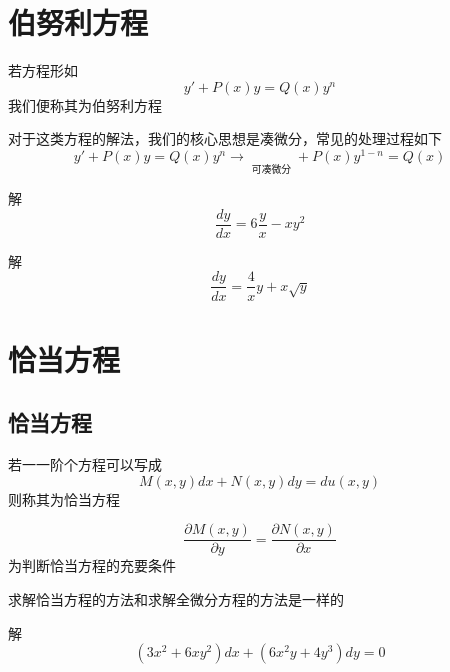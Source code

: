 \documentclass[lang=cn,14pt]{elegantbook}
\begin{document}
	\section{伯努利方程}
	\begin{definition}[伯努利方程]
		若方程形如
		\begin{equation*}
			y'+P\left( x \right) y=Q\left( x \right) y^n 
		\end{equation*}
		我们便称其为伯努利方程
	\end{definition}
	\begin{remark}
		对于这类方程的解法，我们的核心思想是凑微分，常见的处理过程如下
		\begin{equation*}
			y'+P\left( x \right) y=Q\left( x \right) y^n\rightarrow \mathop {\underbrace{y^{-n}y'}} \limits_{\text{可凑微分}}+P\left( x \right) y^{1-n}=Q\left( x \right) 
		\end{equation*}
	\end{remark}
	\begin{example}
		解\begin{equation*}
			\frac{dy}{dx}=6\frac{y}{x}-xy^2
		\end{equation*}
	\end{example}
	\vspace{2cm}
	\begin{example}
		解\begin{equation*}
			\frac{dy}{dx}=\frac{4}{x}y+x\sqrt{y}
		\end{equation*}
	\end{example}
	\vspace{2cm}
	\section{恰当方程}
	\subsection{恰当方程}
	\begin{definition}[恰当方程]
		若一一阶个方程可以写成
		\begin{equation*}
			M\left( x,y \right) dx+N\left( x,y \right) dy=du\left( x,y \right) 
		\end{equation*}
		则称其为恰当方程
	\end{definition}
	\begin{remark}
		\begin{equation*}
			\frac{\partial M\left( x,y \right)}{\partial y}=\frac{\partial N\left( x,y \right)}{\partial x}
		\end{equation*}
		为判断恰当方程的充要条件
	\end{remark}
	\begin{remark}
		求解恰当方程的方法和求解全微分方程的方法是一样的
	\end{remark}
		\begin{example}
		解\begin{equation*}
			\left( 3x^2+6xy^2 \right) dx+\left( 6x^2y+4y^3 \right) dy=0
		\end{equation*}
	\end{example}
	\vspace{2cm}
\end{document}
